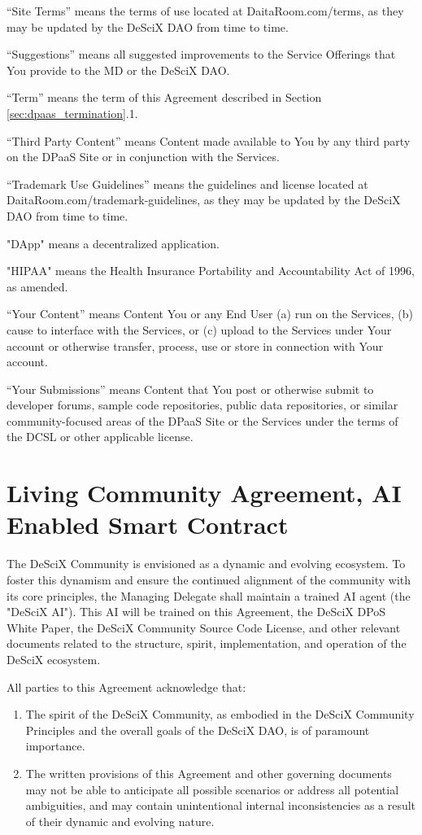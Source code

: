 \documentclass{article}
\begin{document}
“Site Terms” means the terms of use located at DaitaRoom.com/terms, as they may be updated by the DeSciX DAO from time to time.

“Suggestions” means all suggested improvements to the Service Offerings that You provide to the MD or the DeSciX DAO.

“Term” means the term of this Agreement described in Section \ref{sec:dpaas_termination}.1.

“Third Party Content” means Content made available to You by any third party on the DPaaS Site or in conjunction with the Services.

“Trademark Use Guidelines” means the guidelines and license located at DaitaRoom.com/trademark-guidelines, as they may be updated by the DeSciX DAO from time to time.

"DApp" means a decentralized application.

"HIPAA" means the Health Insurance Portability and Accountability Act of 1996, as amended.

“Your Content” means Content You or any End User (a) run on the Services, (b) cause to interface with the Services, or (c) upload to the Services under Your account or otherwise transfer, process, use or store in connection with Your account.

“Your Submissions” means Content that You post or otherwise submit to developer forums, sample code repositories, public data repositories, or similar community-focused areas of the DPaaS Site or the Services under the terms of the DCSL or other applicable license.

\section{Living Community Agreement, AI Enabled Smart Contract} \label{sec:living}

The DeSciX Community is envisioned as a dynamic and evolving ecosystem. To foster this dynamism and ensure the continued alignment of the community with its core principles, the Managing Delegate shall maintain a trained AI agent (the "DeSciX AI"). This AI will be trained on this Agreement, the DeSciX DPoS White Paper, the DeSciX Community Source Code License, and other relevant documents related to the structure, spirit, implementation, and operation of the DeSciX ecosystem.

All parties to this Agreement acknowledge that:

\begin{enumerate}
    \item The spirit of the DeSciX Community, as embodied in the DeSciX Community Principles and the overall goals of the DeSciX DAO, is of paramount importance.
    \item The written provisions of this Agreement and other governing documents may not be able to anticipate all possible scenarios or address all potential ambiguities, and may contain unintentional internal inconsistencies as a result of their dynamic and evolving nature.
\end{enumerate}
\end{document}
